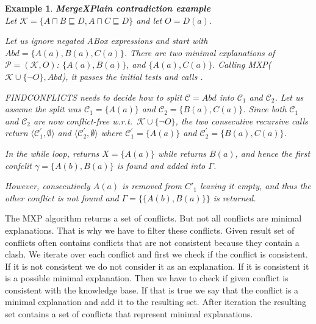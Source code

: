 \documentclass[12pt,a4paper]{article}
\newtheorem{example}{Example}[subsection]
\begin{document}
\newpage
\begin{example}{\textbf{MergeXPlain contradiction example}}
	\label{example:mxpContradiction}
	\\
	Let $\mathcal{K} = \{ A \sqcap B \sqsubseteq D, A \sqcap C \sqsubseteq D\}$ and let $O = D(a)$. 
	
	Let us ignore negated ABox expressions and start with $Abd = \{ A(a), B(a),
	C(a)\}$. There are two minimal explanations of $\mathcal{P} = (\mathcal{K},O)$: $\{A(a),B(a)\}$, and	$\{A(a),C(a)\}$. Calling MXP($\mathcal{K} \cup \{\neg O\}, Abd$), it passes the
	initial tests and calls .
	
	\textsc{FINDCONFLICTS} needs to decide how to split $\mathcal{C} = Abd$ into $\mathcal{C}_{1}$
	and $\mathcal{C}_{2}$. Let us assume the split was $\mathcal{C}_{1} = \{A(a)\}$ and $\mathcal{C}_{2} =
	\{B(a),C(a)\}$. Since both $\mathcal{C}_{1}$ and $\mathcal{C}_{2}$ are now conflict-free w.r.t.\
	$\mathcal{K} \cup \{\neg O\}$, the two consecutive recursive calls return
	$\langle \mathcal{C}^{\prime}_{1},\emptyset \rangle$ and $\langle \mathcal{C}^{\prime}_{2},\emptyset \rangle$ where
	$\mathcal{C}^{\prime}_{1}=\{A(a)\}$ and $\mathcal{C}^{\prime}_{2}=\{B(a),C(a)\}$.
	
	In the while loop, \Call{GETCONFLICT}{$\mathcal{K} \cup \{\neg O\}\cup
		\{B(a),C(a)\},$ $\{B(a),C(a)\},$ $\{A(a)\}$} returns $X = \{A(a)\}$ while
	 returns $B(a)$, and hence the first
	confclit $\gamma = \{A(b),B(a)\}$ is found and added into $\Gamma$.
	
	However, consecutively $A(a)$ is removed from $C'_1$ leaving it empty,
	and thus the other conflict is not found and $\Gamma = \{\{A(b),B(a)\}\}$ is
	returned.	
\end{example}

The MXP algorithm returns a set of conflicts. But not all conflicts are minimal explanations. That is why we have to filter these conflicts. Given result set of conflicts often contains conflicts that are not consistent because they contain a clash. We iterate over each conflict and first we check if the conflict is consistent. If it is not consistent we do not consider it as an explanation. If it is consistent it is a possible minimal explanation. Then we have to check if given conflict is consistent with the knowledge base. If that is true we say that the conflict is a minimal explanation and add it to the resulting set. After iteration the resulting set contains a set of conflicts that represent minimal explanations.
\end{document}
